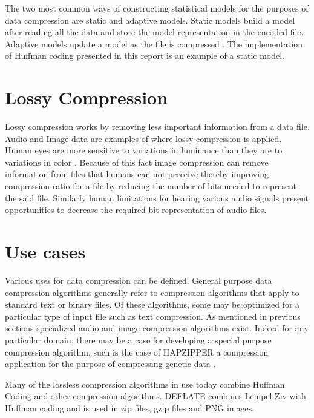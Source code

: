 \doublespacing
\singlespacing
The two most common ways of constructing statistical models for the purposes of data compression are static and adaptive models. Static models build a model after reading all the data and store the model representation in the encoded file. Adaptive models update a model as the file is compressed \cite{WikiLossless}. The implementation of Huffman coding presented in this report is an example of a static model.


\doublespacing
\singlespacing
\section{Lossy Compression}


\singlespacing


Lossy compression works by removing less important information from a data file. Audio and Image data are examples of where lossy compression is applied. Human eyes are more sensitive to variations in luminance than they are to variations in color \cite{WikiDataCompression}. Because of this fact image compression can remove information from files that humans can not perceive thereby improving compression ratio for a file by reducing the number of bits needed to represent the said file. Similarly human limitations for hearing various audio signals present opportunities to decrease the required bit representation of audio files.


\doublespacing
\singlespacing
\section{Use cases}


\singlespacing


Various uses for data compression can be defined. General purpose data compression algorithms generally refer to compression algorithms that apply to standard text or binary files. Of these algorithms, some may be optimized for a particular type of input file such as text compression. As mentioned in previous sections specialized audio and image compression algorithms exist. Indeed for any particular domain, there may be a case for developing a special purpose compression algorithm, such is the case of HAPZIPPER a compression application for the purpose of compressing genetic data \cite{WikiLossless}.


\doublespacing
\singlespacing


Many of the lossless compression algorithms in use today combine Huffman Coding and other compression algorithms. DEFLATE combines Lempel-Ziv with Huffman coding and is used in zip files, gzip files and PNG images. 


